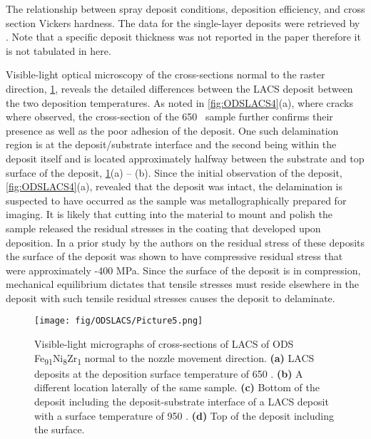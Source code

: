 	


\begin{table}[]
	\caption[The relationship between spray deposit conditions, deposition efficiency, and cross section Vickers hardness.]{The relationship between spray deposit conditions, deposition efficiency, and cross section Vickers hardness. The data for the single-layer deposits were retrieved by \cite{RN383}. Note that a specific deposit thickness was not reported in the paper therefore it is not tabulated in here.}
	
	\label{tab:ODSLACS1}
\end{table}



	Visible-light optical microscopy of the cross-sections normal to the raster direction, \ref{fig:ODSLACS5}, reveals the detailed differences between the LACS deposit between the two deposition temperatures. As noted in \ref{fig:ODSLACS4}(a), where cracks where observed, the cross-section of the 650 \celsius{} sample further confirms their presence as well as the poor adhesion of the deposit. One such delamination region is at the deposit/substrate interface and the second being within the deposit itself and is located approximately halfway between the substrate and top surface of the deposit, \ref{fig:ODSLACS5}(a) – (b). Since the initial observation of the deposit, \ref{fig:ODSLACS4}(a), revealed that the deposit was intact, the delamination is suspected to have occurred as the sample was metallographically prepared for imaging. It is likely that cutting into the material to mount and polish the sample released the residual stresses in the coating that developed upon deposition. In a prior study by the authors on the residual stress of these deposits \cite{RN3459} the surface of the deposit was shown to have compressive residual stress that were approximately -400 MPa. Since the surface of the deposit is in compression, mechanical equilibrium dictates that tensile stresses must reside elsewhere in the deposit with such tensile residual stresses causes the deposit to delaminate. 


			\begin{figure}
				\centering
				\texttt{[image: fig/ODSLACS/Picture5.png]}
				\caption[Visible-light micrographs of cross-sections of LACS of ODS Fe\textsubscript{91}Ni\textsubscript{8}Zr\textsubscript{1 }normal to the nozzle movement direction.]{Visible-light micrographs of cross-sections of LACS of ODS Fe\textsubscript{91}Ni\textsubscript{8}Zr\textsubscript{1 }normal to the nozzle movement direction.\textsubscript{ }\textbf{(a)} LACS deposits at the deposition surface temperature of 650 \celsius{}. \textbf{(b)} A different location laterally of the same sample. \textbf{(c)} Bottom of the deposit including the deposit-substrate interface of a LACS deposit with a surface temperature of 950 \celsius{}. \textbf{(d) }Top of the deposit including the surface.}
				\label{fig:ODSLACS5}
			\end{figure}





